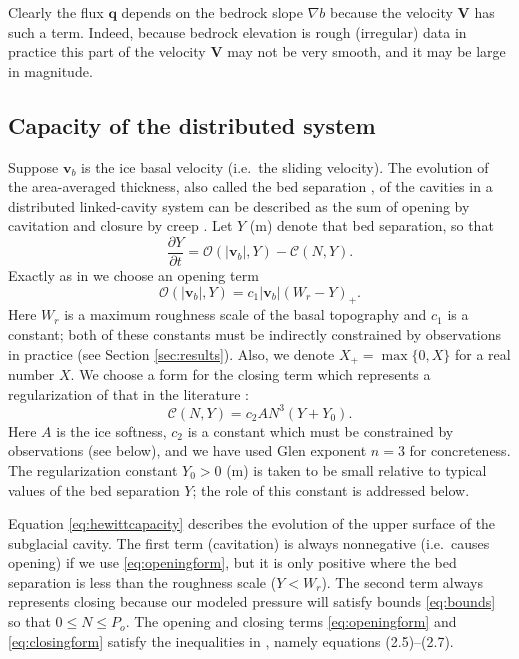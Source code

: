 \documentclass[11pt,final]{amsart}
\newcommand\bv{\mathbf{v}}
\newcommand\bV{\mathbf{V}}
\newcommand\bq{\mathbf{q}}
\newcommand{\grad}{\nabla}
\begin{document}
Clearly the flux $\bq$ depends on the bedrock slope $\grad b$ because the velocity $\bV$ has such a term.  Indeed, because bedrock elevation is rough (irregular) data in practice this part of the velocity $\bV$ may not be very smooth, and it may be large in magnitude.


\subsection*{Capacity of the distributed system}  Suppose $\bv_b$ is the ice basal velocity (i.e.~the sliding velocity).  The evolution of the area-averaged thickness, also called the bed separation \citep{Bartholomausetal2011}, of the cavities in a distributed linked-cavity system \citep{Schoofetal2012} can be described as the sum of opening by cavitation and closure by creep \citep{Hewitt2011}.  Let $Y$ (m) denote that bed separation, so that
\begin{equation}
\frac{\partial Y}{\partial t} = \mathcal{O}(|\bv_b|,Y) - \mathcal{C}(N,Y). \label{eq:hewittcapacity}
\end{equation}
Exactly as in \cite{Schoofetal2012} we choose an opening term
\begin{equation}
 \mathcal{O}(|\bv_b|,Y) = c_1 |\bv_b| (W_r - Y)_+. \label{eq:openingform}
\end{equation}
Here $W_r$ is a maximum roughness scale of the basal topography and $c_1$ is a constant; both of these constants must be indirectly constrained by observations in practice (see Section \ref{sec:results}).  Also, we denote $X_+= \max\{0,X\}$ for a real number $X$.  We choose a form for the closing term which represents a regularization of that in the literature \citep{Hewitt2011,Schoofmeltsupply,Schoofetal2012}:
\begin{equation}
\mathcal{C}(N,Y) = c_2 A N^3 (Y+Y_0). \label{eq:closingform}
\end{equation}
Here $A$ is the ice softness, $c_2$ is a constant which must be constrained by observations (see below), and we have used Glen exponent $n=3$ for concreteness.  The regularization constant $Y_0>0$ (m) is taken to be small relative to typical values of the bed separation $Y$; the role of this constant is addressed below.

Equation \eqref{eq:hewittcapacity} describes the evolution of the upper surface of the subglacial cavity.  The first term (cavitation) is always nonnegative (i.e.~causes opening) if we use \eqref{eq:openingform}, but it is only positive where the bed separation is less than the roughness scale ($Y<W_r$).  The second term always represents closing because our modeled pressure will satisfy bounds \eqref{eq:bounds} so that $0\le N \le P_o$.  The opening and closing terms \eqref{eq:openingform} and \eqref{eq:closingform} satisfy the inequalities in \cite{Schoofetal2012}, namely equations (2.5)--(2.7).
\end{document}
